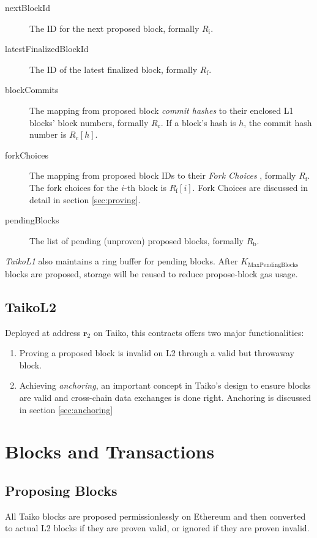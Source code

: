 \documentclass[9pt,oneside]{amsart}
\begin{document}
\begin{multicols}{2}
\begin{description}
\item[nextBlockId] The ID for the next proposed block, formally $R_\mathrm{i}$.
\item[latestFinalizedBlockId] The ID of the latest finalized block, formally $R_\mathrm{f}$.
\item [blockCommits] The mapping from proposed block \textit{commit hashes} to their enclosed L1 blocks' block numbers, formally $R_\mathrm{c}$. If a block's hash is $h$, the commit hash number is $R_\mathrm{c}[h]$.
\item[forkChoices] The mapping from proposed block IDs to their \textit{Fork Choices} , formally $R_\mathrm{f}$. The fork choices for the $i$-th block is $R_\mathrm{f}[i]$. Fork Choices are discussed in detail in section \ref{sec:proving}.
\item[pendingBlocks] The list of pending (unproven) proposed blocks, formally $R_\mathrm{b}$.
\end{description}


\textit{TaikoL1} also maintains a ring buffer for pending blocks. After $K_{\mathrm{MaxPendingBlocks}}$ blocks are proposed, storage will be reused to reduce propose-block gas usage.

\subsection{TaikoL2} Deployed at address $\mathbf{r_{\mathrm{2}}}$ on Taiko, this contracts offers two major functionalities:
\begin{enumerate}
\item Proving a proposed block is invalid on L2 through a valid but throwaway block.
\item Achieving \textit{anchoring}, an important concept in Taiko's design to ensure blocks are valid and cross-chain data exchanges is done right. Anchoring is discussed in section \ref{sec:anchoring}
\end{enumerate}

\section{Blocks and Transactions}

\subsection{Proposing Blocks}
All Taiko blocks are proposed permissionlessly on Ethereum and then converted to actual L2 blocks if they are proven valid, or ignored if they are proven invalid.


\end{multicols}
\end{document}
